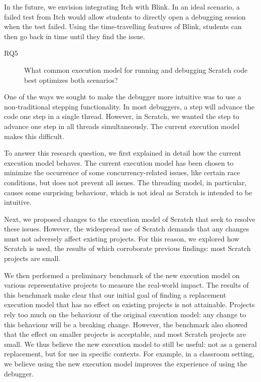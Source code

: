 \documentclass[main]{subfiles}
\begin{document}
In the future, we envision integrating Itch with Blink.
In an ideal scenario, a failed test from Itch would allow students to directly open a debugging session when the test failed.
Using the time-travelling features of Blink, students can then go back in time until they find the issue.

\begin{description}
    \item[RQ5] What common execution model for running and debugging Scratch code best optimizes both scenarios?
\end{description}

One of the ways we sought to make the debugger more intuitive was to use a non-traditional stepping functionality.
In most debuggers, a step will advance the code one step in a single thread.
However, in Scratch, we wanted the step to advance one step in all threads simultaneously.
The current execution model makes this difficult.

To answer this research question, we first explained in detail how the current execution model behaves.
The current execution model has been chosen to minimize the occurrence of some concurrency-related issues, like certain race conditions, but does not prevent all issues.
The threading model, in particular, causes some surprising behaviour, which is not ideal as Scratch is intended to be intuitive.

Next, we proposed changes to the execution model of Scratch that seek to resolve these issues.
However, the widespread use of Scratch demands that any changes must not adversely affect existing projects.
For this reason, we explored how Scratch is used, the results of which corroborate previous findings: most Scratch projects are small.

We then performed a preliminary benchmark of the new execution model on various representative projects to measure the real-world impact.
The results of this benchmark make clear that our initial goal of finding a replacement execution model that has no effect on existing projects is not attainable.
Projects rely too much on the behaviour of the original execution model: any change to this behaviour will be a breaking change.
However, the benchmark also showed that the effect on smaller projects is acceptable, and most Scratch projects are small.
We thus believe the new execution model to still be useful: not as a general replacement, but for use in specific contexts.
For example, in a classroom setting, we believe using the new execution model improves the experience of using the debugger.
\end{document}
